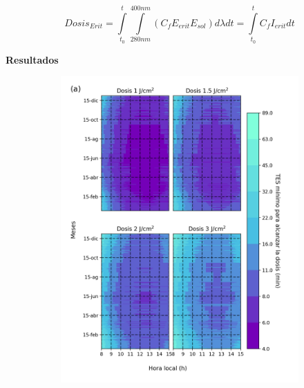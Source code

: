 \documentclass{article}
\begin{document}
\begin{multicols}{2}
\begin{equation*}
    Dosis_{Erit}=\int\limits_{t_0}^{t} \int\limits_{280nm}^{400nm} \left( C_f E_{erit}E_{sol}\right)d\lambda dt = \int\limits_{t_0}^{t}C_f I_{erit}dt
\end{equation*}
\vspace{0.05cm}
\begin{center}
    \begin{shaded}
    \textbf{\textcolor{na}{Resultados}}
    \end{shaded}
    \end{center}
\begin{figure}[H]
    \begin{subfigure}[H]{0.5\linewidth}
        \centering
        \vspace{-0.1cm}
        \includegraphics[scale=0.38]{images/pso.png}
    \end{subfigure}
    \begin{subfigure}[H]{0.4\linewidth}
        \centering
        \vspace{-0.2cm}

\end{subfigure}
\end{figure}
\end{multicols}
\end{document}

